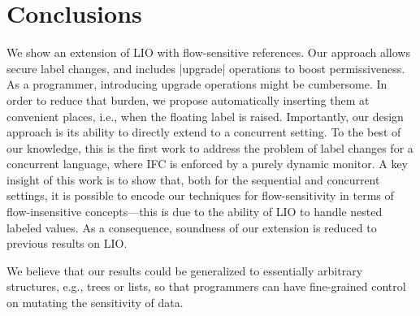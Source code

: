 \section{Conclusions}
\label{sec:conclusion}

We show an extension of LIO with flow-sensitive references. Our approach allows
secure label changes, and includes |upgrade| operations to boost
permissiveness. As a programmer, introducing upgrade operations might be
cumbersome. In order to reduce that burden, we propose automatically inserting
them at convenient places, i.e., when the floating label is raised.
Importantly, our design approach is its ability to directly extend to a
concurrent setting.  To the best of our knowledge, this is the first work to
address the problem of label changes for a concurrent language, where IFC is
enforced by a purely dynamic monitor.  A key insight of this work is to show
that, both for the sequential and concurrent settings, it is possible to encode
our techniques for flow-sensitivity in terms of flow-insensitive
concepts---this is due to the ability of LIO to handle nested labeled values.
As a consequence, soundness of our extension is reduced to previous results on
LIO.

We believe that our results could be generalized to essentially arbitrary
structures, e.g., trees or lists, so that programmers
can have fine-grained control on mutating the sensitivity of data.

